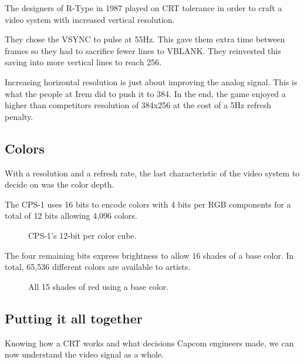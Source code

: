 \pagebreak
\begin{trivia}
The designers of R-Type in 1987 played on CRT tolerance in order to craft a video system with increased vertical resolution. 

They chose the VSYNC to pulse at 55Hz. This gave them extra time between frames so they had to sacrifice fewer lines to VBLANK. They reinvested this saving into more vertical lines to reach 256.

Increasing horizontal resolution is just about improving the analog signal. This is what the people at Irem did to push it to 384. In the end, the game enjoyed a higher than competitors resolution of 384x256 at the cost of a 5Hz refresh penalty.
\end{trivia}



\subsection{Colors}
With a resolution and a refresh rate, the last characteristic of the video system to decide on was the color depth. 

The CPS-1 uses 16 bits to encode colors with 4 bits per RGB components for a total of 12 bits allowing 4,096 colors. 


\begin{figure}[H]
\begin{minipage}[t]{0.49\linewidth}
\end{minipage}%
\hfill%
\begin{minipage}[t]{0.49\linewidth}
\end{minipage}
\caption*{CPS-1's 12-bit per color cube.}
\end{figure}
  
The four remaining bits express brightness to allow 16 shades of a base color. In total, 65,536 different colors are available to artists.

\begin{figure}[H]
\caption*{All 15 shades of red using a  base color.}
\end{figure}

\subsection{Putting it all together}

Knowing how a CRT works and what decisions Capcom engineers made, we can now understand the video signal as a whole.

